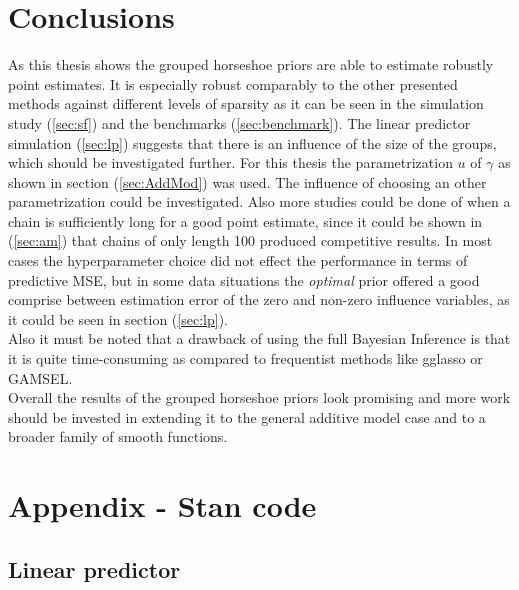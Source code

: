 \documentclass[12pt,letterpaper]{article}
\numberwithin{equation}{subsection}
\begin{document}
\section{Conclusions}
As this thesis shows the grouped horseshoe priors are able to estimate robustly point estimates. It is especially robust comparably to the other presented methods against different levels of sparsity as it can be seen in the simulation study (\ref{sec:sf}) and the benchmarks (\ref{sec:benchmark}).
The linear predictor simulation (\ref{sec:lp}) suggests that there is an influence of the size of the groups, which should be investigated further. For this thesis the parametrization $u$ of $\gamma$ as shown in section (\ref{sec:AddMod}) was used. The influence of choosing an other parametrization could be investigated. Also more studies could be done of when a chain is sufficiently long for a good point estimate, since it could be shown in (\ref{sec:am}) that chains of only length 100 produced competitive results. In most cases the hyperparameter choice did not effect the performance in terms of predictive MSE, but in some data situations the \textit{optimal} prior offered a good comprise between estimation error of the zero and non-zero influence variables, as it could be seen in section (\ref{sec:lp}).\\
Also it must be noted that a drawback of using the full Bayesian Inference is that it is quite time-consuming as compared to frequentist methods like gglasso or GAMSEL.  \\
Overall the results of the grouped horseshoe priors look promising and more work should be invested in extending it to the general additive model case and to a broader family of smooth functions. 
\pagebreak
\section{Appendix - Stan code} 
\subsection{Linear predictor}

\pagebreak
\end{document}
